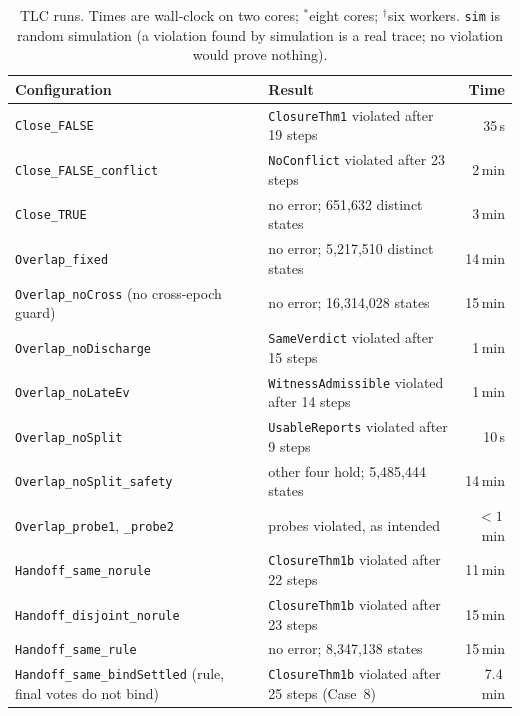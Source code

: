 \documentclass[conference]{IEEEtran}
\begin{document}
\begin{table}[t]
\caption{TLC runs. Times are wall-clock on two cores; $^*$eight cores; $^\dagger$six workers. \texttt{sim} is random simulation (a violation found by simulation is a real trace; no violation would prove nothing).}
\label{tab:tlc}
\centering
\small
\begin{tabularx}{\textwidth}{@{}>{\raggedright\arraybackslash}p{}Yr@{}}
\toprule
Configuration & Result & Time\\
\midrule
\texttt{Close\_\allowbreak{}FALSE} & \texttt{ClosureThm1} violated after 19 steps & 35\,s\\
\texttt{Close\_\allowbreak{}FALSE\_\allowbreak{}conflict} & \texttt{NoConflict} violated after 23 steps & 2\,min\\
\texttt{Close\_\allowbreak{}TRUE} & no error; 651,632 distinct states & 3\,min\\
\texttt{Overlap\_\allowbreak{}fixed} & no error; 5,217,510 distinct states & 14\,min\\
\texttt{Overlap\_\allowbreak{}noCross} (no cross-epoch guard) & no error; 16,314,028 states & 15\,min\\
\texttt{Overlap\_\allowbreak{}noDischarge} & \texttt{SameVerdict} violated after 15 steps & 1\,min\\
\texttt{Overlap\_\allowbreak{}noLateEv} & \texttt{WitnessAdmissible} violated after 14 steps & 1\,min\\
\texttt{Overlap\_\allowbreak{}noSplit} & \texttt{UsableReports} violated after 9 steps & 10\,s\\
\texttt{Overlap\_\allowbreak{}noSplit\_\allowbreak{}safety} & other four hold; 5,485,444 states & 14\,min\\
\texttt{Overlap\_\allowbreak{}probe1},\allowbreak{} \texttt{\_\allowbreak{}probe2} & probes violated, as intended & $<1$\,min\\
\texttt{Handoff\_\allowbreak{}same\_\allowbreak{}norule} & \texttt{ClosureThm1b} violated after 22 steps & 11\,min\\
\texttt{Handoff\_\allowbreak{}disjoint\_\allowbreak{}norule} & \texttt{ClosureThm1b} violated after 23 steps & 15\,min\\
\texttt{Handoff\_\allowbreak{}same\_\allowbreak{}rule} & no error; 8,347,138 states & 15\,min\\
\texttt{Handoff\_\allowbreak{}same\_\allowbreak{}bindSettled} (rule,\allowbreak{} final votes do not bind) & \texttt{ClosureThm1b} violated after 25 steps (Case~8) & 7.4\,min\\

\end{tabularx}
\end{table}
\end{document}
